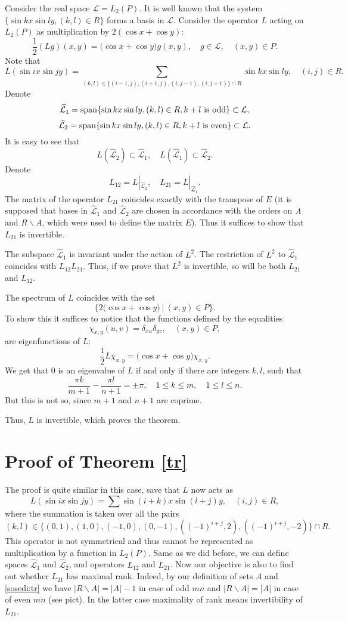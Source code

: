 \documentclass[english,12pt]{article}
\theoremstyle{remark}
\theoremstyle{definition}
\theoremstyle{definition}
\newcommand {\lone} {\widehat{\mathcal L}_1}
\newcommand {\ltwo} {\widehat{\mathcal L}_2}
\begin{document}
Consider the real space $\mathcal L=L_2(P)$. It is well known that the system $\{ \sin kx \sin ly,
(k,l) \in R \}$ forms a basis in $\mathcal L$. Consider the operator $L$ acting on $L_2(P)$ as
multiplication by $ 2 (\cos x + \cos y)$:
\[ \frac 1 2
(Lg)(x,y)= \Big(\cos x + \cos y\Big)g(x,y), \quad g \in \mathcal L,
   \quad (x,y) \in P. \]
Note that
\[ L(\sin ix \sin jy)=\sum_{(k,l) \in \{(i-1,j),(i+1,j),(i,j-1),(i,j+1)\} \cap R} \sin kx \sin ly,
   \quad (i,j) \in R. \]
Denote
\[ \lone = {\rm span}\{ \sin kx \sin ly, (k,l) \in R, k+l \text{ is odd}\} \subset \mathcal L, \]
\[ \ltwo = {\rm span}\{ \sin kx \sin ly, (k,l) \in R, k+l \text{ is even}\} \subset \mathcal L. \]
It is easy to see that
\[ L(\ltwo) \subset \lone, \quad L(\lone) \subset \ltwo. \]
Denote
\[ L_{12}=L|_{\ltwo}, \quad L_{21}=L|_{\lone}. \]
The matrix of the operator $L_{21}$ coincides exactly with the transpose of $E$ (it is supposed
that bases in $\lone$ and $\ltwo$ are chosen in accordance with the orders on $A$ and $R\backslash
A$, which were used to define the matrix $E$). Thus it suffices to show that $L_{21}$ is
invertible.

The subspace $\lone$ is invariant under the action of $L^2$. The restriction of $L^2$ to $\lone$
coincides with $L_{12}L_{21}$. Thus, if we prove that $L^2$ is invertible, so will be both $L_{21}$
and $L_{12}$.

The spectrum of $L$ coincides with the set
\[ \Big\{2 \Big( \cos x + \cos y\Big)\ \Big|\ (x,y) \in P \Big\}. \]
To show this it suffices to notice that the functions defined by the equalities
\[ \chi_{x,y}(u,v)=\delta_{xu}\delta_{yv},\quad (x,y)\in P, \]
are eigenfunctions of $L$:
\[ \frac 1 2 L \chi_{x,y}= \Big(\cos x + \cos y\Big) \chi_{x,y}. \]
We get that $0$ is an eigenvalue of $L$ if and only if there are integers $k,l$, such that
\[ \frac{\pi k}{m+1}-\frac{\pi l}{n+1} = \pm \pi, \quad 1 \leq k \leq m, \quad 1 \leq l \leq n. \]
But this is not so, since $m+1$ and $n+1$ are coprime.

Thus, $L$ is invertible, which proves the theorem.


\section{Proof of Theorem \ref{tr}}


The proof is quite similar in this case, save that $L$ now acts as
\begin{equation}
  L(\sin ix \sin jy)=\sum \sin (i+k)x \sin (l+j)y,\quad (i,j) \in R,
\end{equation}
where the summation is taken over all the pairs
\[ (k,l)\in\{(0,1),(1,0),(-1,0),(0,-1),((-1)^{i+j},2),((-1)^{i+j},-2)\}\cap R. \]
This operator is not symmetrical and thus cannot be represented as multiplication by a function in
$L_2(P)$. Same as we did before, we can define spaces $\lone$ and $\ltwo$, and operators $L_{12}$
and $L_{21}$. Now our objective is also to find out whether $L_{21}$ has maximal rank. Indeed, by
our definition of sets $A$ and \eqref{sosedi:tr} we have $|R\backslash A|=|A|-1$ in case of odd
$mn$ and $|R\backslash A|=|A|$ in case of even $mn$ (see pict). In the latter case maximality of
rank means invertibility of $L_{21}$.
\end{document}
